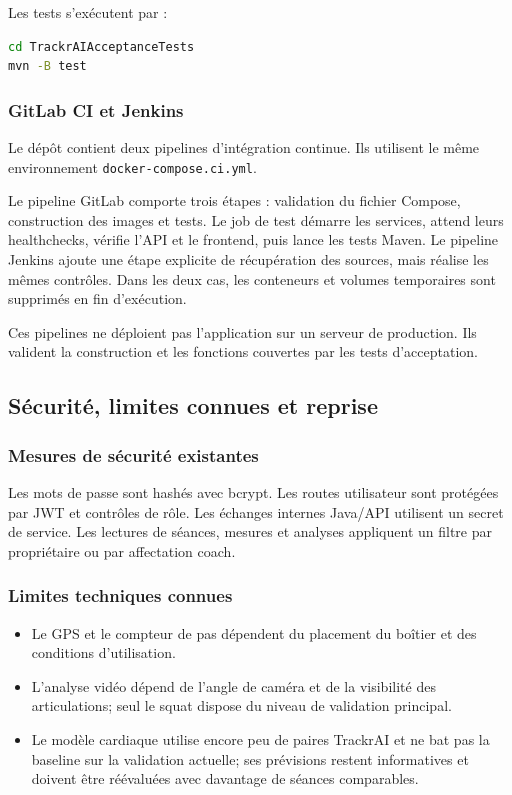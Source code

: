 \documentclass[11pt,a4paper]{article}
\newcommand{\code}[1]{\nolinkurl{#1}}
\begin{document}
Les tests s'exécutent par :

\begin{lstlisting}[language=bash]
cd TrackrAIAcceptanceTests
mvn -B test
\end{lstlisting}

\subsubsection{GitLab CI et Jenkins}

Le dépôt contient deux pipelines d'intégration continue. Ils utilisent le même environnement \code{docker-compose.ci.yml}.

Le pipeline GitLab comporte trois étapes : validation du fichier Compose, construction des images et tests. Le job de test démarre les services, attend leurs healthchecks, vérifie l'API et le frontend, puis lance les tests Maven. Le pipeline Jenkins ajoute une étape explicite de récupération des sources, mais réalise les mêmes contrôles. Dans les deux cas, les conteneurs et volumes temporaires sont supprimés en fin d'exécution.

Ces pipelines ne déploient pas l'application sur un serveur de production. Ils valident la construction et les fonctions couvertes par les tests d'acceptation.

\subsection{Sécurité, limites connues et reprise}
\label{sec:limites}

\subsubsection{Mesures de sécurité existantes}

Les mots de passe sont hashés avec bcrypt. Les routes utilisateur sont protégées par JWT et contrôles de rôle. Les échanges internes Java/API utilisent un secret de service. Les lectures de séances, mesures et analyses appliquent un filtre par propriétaire ou par affectation coach.

\subsubsection{Limites techniques connues}

\begin{itemize}
  \item Le GPS et le compteur de pas dépendent du placement du boîtier et des conditions d'utilisation.
  \item L'analyse vidéo dépend de l'angle de caméra et de la visibilité des articulations; seul le squat dispose du niveau de validation principal.
  \item Le modèle cardiaque utilise encore peu de paires TrackrAI et ne bat pas la baseline sur la validation actuelle; ses prévisions restent informatives et doivent être réévaluées avec davantage de séances comparables.
\end{itemize}
\end{document}
